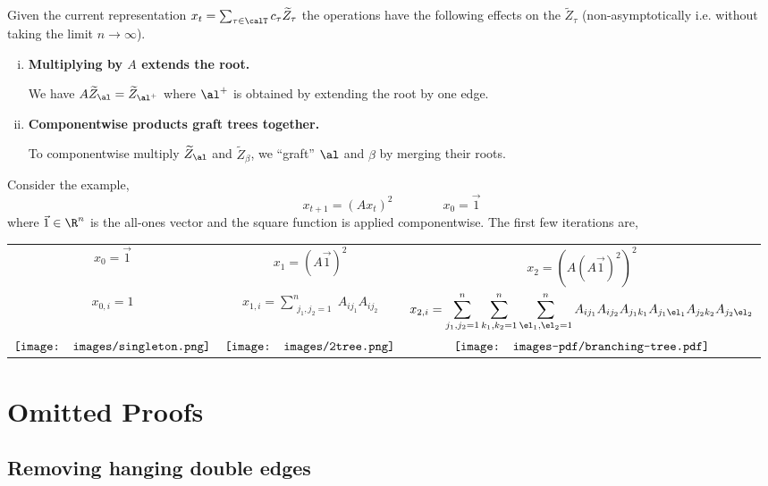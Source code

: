 \documentclass[12pt]{article}
\begin{document}
Given the current representation $x_t = \sum_{\tau \in \calT} c_\tau \widetilde{Z}_\tau$
the operations have the following effects on the $\widetilde{Z}_\tau$
(non-asymptotically i.e. without taking the limit $n \to \infty$).
\begin{enumerate}[(i)]
    \item \textbf{Multiplying by $A$ extends the root.}

    We have $A \widetilde{Z}_\al = \widetilde{Z}_{\al^+}$ where $\al^+$ is obtained by extending the root by one edge.
    \item \textbf{Componentwise products graft trees together.}

    To componentwise multiply $\widetilde{Z}_\al$ and $\widetilde{Z}_\beta$,
    we ``graft'' $\al$ and $\beta$ by merging their roots.
\end{enumerate}


\begin{example}
Consider the example,
\[x_{t+1} = (Ax_t)^2 \qquad\qquad x_0 = \vec{1}\]
where $\vec{1} \in \R^n$ is the all-ones vector and the square function
is applied componentwise.
The first few iterations are,
    \begin{center}
    \begin{tabular}{c|c|c}
        $x_0 = \vec{1}$ & $x_1 = (A\vec{1})^2$ & $x_2 = (A(A\vec{1})^2)^2$\\
        $x_{0,i} = 1$ & $\displaystyle x_{1,i} = \sum_{\substack{j_1, j_2 = 1}}^n A_{ij_1}A_{ij_2}$ & $\displaystyle  x_{2,i} = \sum_{j_1,j_2 = 1}^n \sum_{k_1, k_2 = 1}^n\sum_{\el_1,\el_2 = 1}^n A_{ij_1}A_{ij_2} A_{j_1k_1} A_{j_1\el_1} A_{j_2k_2}A_{j_2\el_2}$\\
        $\vcenter{\hbox{\texttt{[image: images/singleton.png]}}}$& $\vcenter{\hbox{\texttt{[image: images/2tree.png]}}}$ & $\vcenter{\hbox{\texttt{[image: images-pdf/branching-tree.pdf]}}}$
    \end{tabular}
    \end{center}
\end{example}
 

\section{Omitted Proofs}
\label{app:non-asymptotic-analysis}


\subsection{Removing hanging double edges}
\label{sec:edge-labels}
\end{document}
